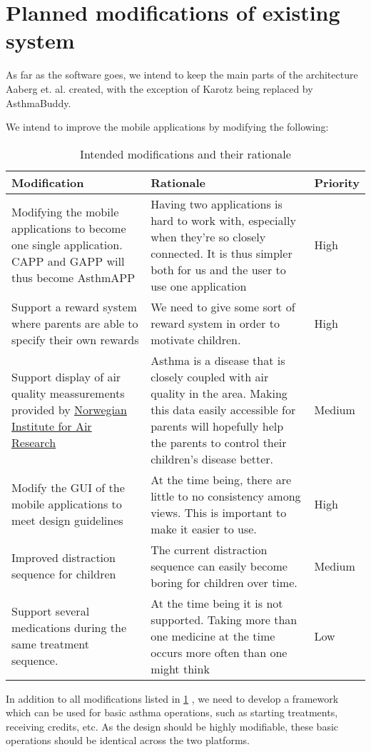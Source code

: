\section{Planned modifications of existing system}
\label{sec:plannedmodsofexistingsystems}
As far as the software goes, we intend to keep the main parts of the architecture Aaberg et. al. created, with the exception of Karotz being replaced by AsthmaBuddy. 


We intend to improve the mobile applications by modifying the following:
\begin{table}

\begin{tabular}{| p{5.0cm} | p{5.0cm} | p{3.0cm} |}
	\hline
	\textbf{Modification} & \textbf{Rationale} & \textbf{Priority} \\
	\hline
	Modifying the mobile applications to become one single application. CAPP and GAPP will thus become AsthmAPP 
	&
	Having two applications is hard to work with, especially when they're so closely connected. It is thus simpler both for us and the user to use one application
	&
	High
	\\ \hline
	Support a reward system where parents are able to specify their own rewards
	&
	We need to give some sort of reward system in order to motivate children.
	&
	High 
	\\ \hline
	Support display of air quality meassurements provided by \href{http://luftkvalitet.info}{Norwegian Institute for Air Research}
	&
	Asthma is a disease that is closely coupled with air quality in the area. Making this data easily accessible for parents will hopefully help the parents to control their children's disease better.
	&
	Medium  
	\\ \hline
	Modify the GUI of the mobile applications to meet design guidelines
	&
	At the time being, there are little to no consistency among views. This is important to make it easier to use.
	&
	High 
	\\ \hline
	Improved distraction sequence for children
	& 
	The current distraction sequence can easily become boring for children over time.
	&
	Medium
	\\ \hline
	Support several medications during the same treatment sequence.
	&
	At the time being it is not supported. Taking more than one medicine at the time occurs more often than one might think
	&
	Low 
	\\ \hline
\end{tabular}
\caption{Intended modifications and their rationale}
\label{tab:intended-modifications}
\end{table}

In addition to all modifications listed in \ref{tab:intended-modifications} , we need to develop a framework which can be used for basic asthma operations, such as starting treatments, receiving credits, etc. As the design should be highly modifiable, these basic operations should be identical across the two platforms.    
 